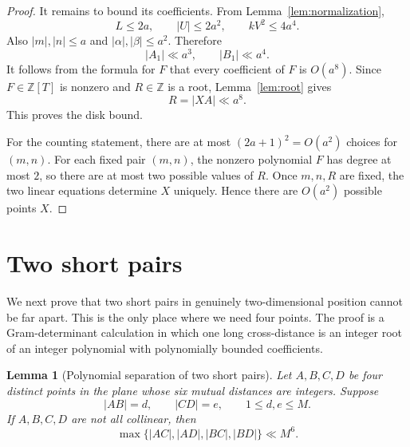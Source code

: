 \documentclass[11pt]{article}
\newtheorem{lemma}[theorem]{Lemma}
\newcommand{\ZZ}{\mathbb Z}
\begin{document}
\begin{proof}
It remains to bound its coefficients.  From Lemma~\ref{lem:normalization},
\[
        L\le2a,
        \qquad |U|\le2a^2,
        \qquad kV^2\le4a^4.
\]
Also \(|m|,|n|\le a\) and \(|\alpha|,|\beta|\le a^2\).  Therefore
\[
        |A_1|\ll a^3,
        \qquad |B_1|\ll a^4.
\]
It follows from the formula for \(F\) that every coefficient of \(F\) is
\(O(a^8)\).  Since \(F\in\ZZ[T]\) is nonzero and \(R\in\ZZ\) is a root,
Lemma~\ref{lem:root} gives
\[
        R=|XA|\ll a^8.
\]
This proves the disk bound.

For the counting statement, there are at most \((2a+1)^2=O(a^2)\) choices for
\((m,n)\).  For each fixed pair \((m,n)\), the nonzero polynomial \(F\) has
degree at most \(2\), so there are at most two possible values of \(R\).  Once
\(m,n,R\) are fixed, the two linear equations determine \(X\) uniquely.  Hence
there are \(O(a^2)\) possible points \(X\).
\end{proof}

\section{Two short pairs}

We next prove that two short pairs in genuinely two-dimensional position cannot
be far apart.  This is the only place where we need four points.  The proof is
a Gram-determinant calculation in which one long cross-distance is an integer
root of an integer polynomial with polynomially bounded coefficients.

\begin{lemma}[Polynomial separation of two short pairs]\label{lem:twopairs}
Let \(A,B,C,D\) be four distinct points in the plane whose six mutual distances
are integers.  Suppose
\[
        |AB|=d,
        \qquad |CD|=e,
        \qquad 1\le d,e\le M.
\]
If \(A,B,C,D\) are not all collinear, then
\[
        \max\{|AC|,|AD|,|BC|,|BD|\}\ll M^6.
\]
\end{lemma}
\end{document}
